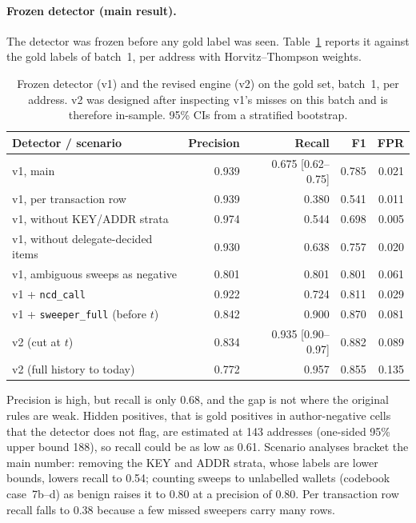 \documentclass[runningheads]{llncs}
\begin{document}
\paragraph{Frozen detector (main result).} The detector was frozen before any
gold label was seen. Table~\ref{tab:gold} reports it against the gold labels of
batch~1, per address with Horvitz--Thompson weights.
\begin{table}[t]
\caption{Frozen detector (v1) and the revised engine (v2) on the gold set,
batch~1, per address. v2 was designed after inspecting v1's misses on this batch
and is therefore in-sample. 95\% CIs from a stratified bootstrap.}
\label{tab:gold}
\centering
\begin{tabular}{@{}lrrrr@{}}
\toprule
Detector / scenario & Precision & Recall & F1 & FPR\\
\midrule
v1, main & 0.939 & 0.675 [0.62--0.75] & 0.785 & 0.021\\
v1, per transaction row & 0.939 & 0.380 & 0.541 & 0.011\\
v1, without KEY/ADDR strata & 0.974 & 0.544 & 0.698 & 0.005\\
v1, without delegate-decided items & 0.930 & 0.638 & 0.757 & 0.020\\
v1, ambiguous sweeps as negative & 0.801 & 0.801 & 0.801 & 0.061\\
\midrule
v1 + \texttt{ncd\_call} & 0.922 & 0.724 & 0.811 & 0.029\\
v1 + \texttt{sweeper\_full} (before $t$) & 0.842 & 0.900 & 0.870 & 0.081\\
v2 (cut at $t$) & 0.834 & 0.935 [0.90--0.97] & 0.882 & 0.089\\
v2 (full history to today) & 0.772 & 0.957 & 0.855 & 0.135\\
\bottomrule
\end{tabular}
\end{table}
Precision is high, but recall is only 0.68, and the gap is not where the
original rules are weak. Hidden positives, that is gold positives in
author-negative cells that the detector does not flag, are estimated at 143
addresses (one-sided 95\% upper bound 188), so recall could be as low as 0.61.
Scenario analyses bracket the main number: removing the KEY and ADDR
strata, whose labels are lower bounds, lowers recall to 0.54;
counting sweeps to unlabelled wallets (codebook case~7b--d) as benign raises it
to 0.80 at a precision of 0.80. Per transaction row recall falls to 0.38 because
a few missed sweepers carry many rows.
\end{document}

